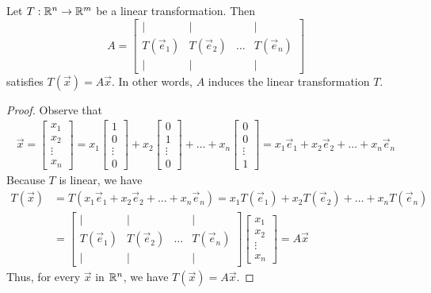 \documentclass{ximera}
\begin{document}
  \begin{theorem}\label{th:matlin} Let $T:\mathbb{R}^n\rightarrow\mathbb{R}^m$ be a linear transformation.  Then 
  \begin{equation*} \label{matlintrans}
 A=\begin{bmatrix}
           | & |& &|\\
		T(\vec{e}_1) & T(\vec{e}_2)&\dots &T(\vec{e}_n)\\
		|&| & &|
         \end{bmatrix}
\end{equation*}
satisfies $T(\vec{x})=A\vec{x}$.  In other words, $A$ induces the linear transformation $T$.
\end{theorem}


\begin{proof}  Observe that
\begin{align*}\vec{x}=\begin{bmatrix}x_1\\x_2\\\vdots\\x_n\end{bmatrix}=x_1\begin{bmatrix}1\\0\\\vdots\\0\end{bmatrix}+x_2\begin{bmatrix}0\\1\\\vdots\\0\end{bmatrix}+\dots+x_n\begin{bmatrix}0\\0\\\vdots\\1\end{bmatrix}=x_1\vec{e}_1+x_2\vec{e}_2+\dots+x_n\vec{e}_n
\end{align*}
Because $T$ is linear, we have
\begin{align*}
T(\vec{x})&=T(x_1\vec{e}_1+x_2\vec{e}_2+\dots+x_n\vec{e}_n)=x_1T(\vec{e}_1)+x_2T(\vec{e}_2)+\dots+x_nT(\vec{e}_n)\\
&=\begin{bmatrix}
           | & |& &|\\
		T(\vec{e}_1) & T(\vec{e}_2)&\dots &T(\vec{e}_n)\\
		|&| & &|
         \end{bmatrix}\begin{bmatrix}x_1\\x_2\\\vdots\\x_n\end{bmatrix}=A\vec{x}
\end{align*}
Thus, for every $\vec{x}$ in $\mathbb{R}^n$, we have $T(\vec{x})=A\vec{x}$. 
\end{proof}
\end{document}
